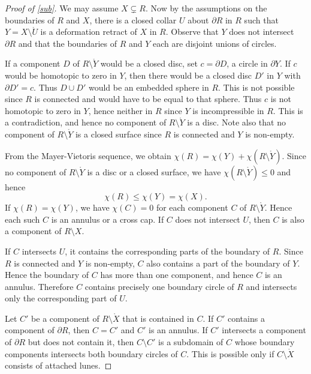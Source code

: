 \begin{proof}[Proof of \cref{sub}]
We may assume $X\subsetneq R$.
Now by the assumptions on the boundaries of $R$ and $X$,
there is a closed collar $U$ about $\partial R$ in $R$
such that $Y=X\setminus\mathring U$ is a deformation retract of $X$ in $R$.
Observe that $Y$ does not intersect $\partial R$
and that the boundaries of $R$ and $Y$ each are disjoint unions of circles.

If a component $D$ of $R\setminus\mathring Y$ would be a closed disc,
set $c=\partial D$, a circle in $\partial Y$.
If $c$  would be homotopic to zero in $Y$,
then there would be a closed disc $D'$ in $Y$ with $\partial D'=c$.
Thus $D\cup D'$ would be an embedded sphere in $R$.
This is not possible since $R$ is connected and would have to be equal to that sphere. 
Thus $c$ is not homotopic to zero in $Y$, hence neither in $R$
since $Y$ is incompressible in $R$.
This is a contradiction, and hence no component of $R\setminus\mathring Y$ is a disc.
Note also that no component of $R\setminus\mathring Y$ is a closed surface
since $R$ is connected and $Y$ is non-empty.

From the Mayer-Vietoris sequence, we obtain
$\chi(R) = \chi(Y) + \chi(R\setminus\mathring Y)$.
Since no component of $R\setminus\mathring Y$ is a disc or a closed surface,
we have $\chi(R\setminus\mathring Y)\le0$ and hence
\begin{equation*}
  \chi(R) \le \chi(Y) = \chi(X).
\end{equation*}
If $\chi(R)=\chi(Y)$,
we have $\chi(C)=0$ for each component $C$ of $R\setminus\mathring Y$.
Hence each such $C$ is an annulus or a cross cap.
If $C$ does not intersect $U$, then $C$ is also a component of $R\setminus X$.

If $C$ intersects $U$, it contains the corresponding parts of the boundary of $R$.
Since $R$ is connected and $Y$ is non-empty,
$C$ also contains a part of the boundary of $Y$.
Hence the boundary of $C$ has more than one component, and hence $C$ is an annulus.
Therefore $C$ contains precisely one boundary circle of $R$
and intersects only the corresponding part of $U$.

Let $C'$ be a component of $R\setminus\mathring X$ that is contained in $C$.
If $C'$ contains a component of $\partial R$,
then $C=C'$ and $C'$ is an annulus.
If $C'$ intersects a component of $\partial R$ but does not contain it,
then $C\setminus C'$ is a subdomain of $C$
whose boundary components intersects both boundary circles of $C$.
This is possible only if $C\setminus\mathring X$ consists of attached lunes.
\end{proof}

